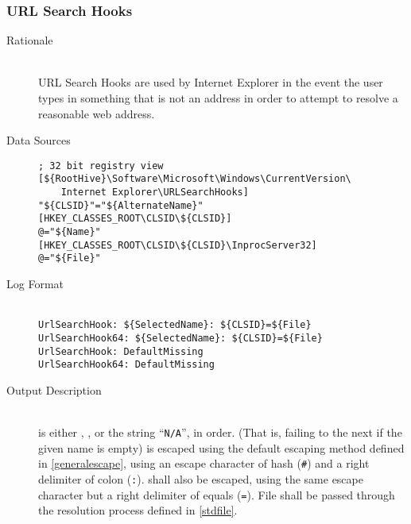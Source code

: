 \subsubsection{URL Search Hooks}
\begin{description}
\item[Rationale] \hfill \\
URL Search Hooks are used by Internet Explorer in the event the user types in
something that is not an address in order to attempt to resolve a reasonable web
address.
\item[Data Sources] \hfill
\vspace{-\baselineskip}
\begin{verbatim}
; 32 bit registry view
[${RootHive}\Software\Microsoft\Windows\CurrentVersion\
    Internet Explorer\URLSearchHooks]
"${CLSID}"="${AlternateName}"
[HKEY_CLASSES_ROOT\CLSID\${CLSID}]
@="${Name}"
[HKEY_CLASSES_ROOT\CLSID\${CLSID}\InprocServer32]
@="${File}"
\end{verbatim}
\item[Log Format] \hfill \\
\verb|UrlSearchHook: ${SelectedName}: ${CLSID}=${File}| \\
\verb|UrlSearchHook64: ${SelectedName}: ${CLSID}=${File}| \\
\verb|UrlSearchHook: DefaultMissing| \\
\verb|UrlSearchHook64: DefaultMissing|
\item[Output Description] \hfill \\
 is either , , or the string
``\verb|N/A|'', in order. (That is, failing to the next if the given name is
empty) \var{SelectedName} is escaped using the default escaping method defined
in \ref{generalescape}, using an escape character of hash (\verb|#|) and a right
delimiter of colon (\verb|:|). \var{CLSID} shall also be escaped, using the
same escape character but a right delimiter of equals (\verb|=|). File shall be
passed through the resolution process defined in \ref{stdfile}.


\end{description}

